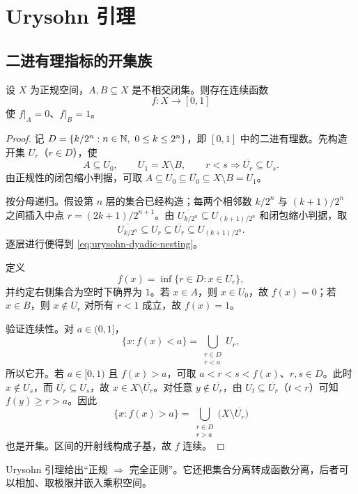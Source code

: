 \section{Urysohn 引理}

\subsection{二进有理指标的开集族}

\begin{theorem}[Urysohn 引理]
\label{thm:urysohn-lemma}
设 \(X\) 为正规空间，\(A,B\subseteq X\) 是不相交闭集。则存在连续函数
\[
 f:X\to[0,1]
\]
使 \(f|_A=0\)、\(f|_B=1\)。
\end{theorem}

\begin{proof}
记 \(D=\{k/2^n:n\in\mathbb{N},\ 0\le k\le2^n\}\)，即 \([0,1]\) 中的二进有理数。先构造开集 \(U_r\)（\(r\in D\)），使
\begin{equation}
 A\subseteq U_0,\qquad U_1=X\setminus B,\qquad
 r<s\Longrightarrow\overline{U_r}\subseteq U_s.
\label{eq:urysohn-dyadic-nesting}
\end{equation}
由正规性的闭包缩小判据，可取 \(A\subseteq U_0\subseteq\overline{U_0}\subseteq X\setminus B=U_1\)。

按分母递归。假设第 \(n\) 层的集合已经构造；每两个相邻数 \(k/2^n\) 与 \((k+1)/2^n\) 之间插入中点 \(r=(2k+1)/2^{n+1}\)。由
\(\overline{U_{k/2^n}}\subseteq U_{(k+1)/2^n}\) 和闭包缩小判据，取
\[
 \overline{U_{k/2^n}}\subseteq U_r
 \subseteq\overline{U_r}\subseteq U_{(k+1)/2^n}.
\]
逐层进行便得到 \eqref{eq:urysohn-dyadic-nesting}。

定义
\[
 f(x)=\inf\{r\in D:x\in U_r\},
\]
并约定右侧集合为空时下确界为 \(1\)。若 \(x\in A\)，则 \(x\in U_0\)，故 \(f(x)=0\)；若 \(x\in B\)，则 \(x\notin U_r\) 对所有 \(r<1\) 成立，故 \(f(x)=1\)。

验证连续性。对 \(a\in(0,1]\)，
\[
 \{x:f(x)<a\}=\bigcup_{\substack{r\in D\\r<a}}U_r,
\]
所以它开。若 \(a\in[0,1)\) 且 \(f(x)>a\)，可取 \(a<r<s<f(x)\)、\(r,s\in D\)。此时 \(x\notin U_s\)，而 \(\overline{U_r}\subseteq U_s\)，故 \(x\in X\setminus\overline{U_r}\)。对任意 \(y\notin\overline{U_r}\)，由 \(U_t\subseteq\overline{U_r}\)（\(t<r\)）可知 \(f(y)\ge r>a\)。因此
\[
 \{x:f(x)>a\}
 =\bigcup_{\substack{r\in D\\r>a}}\bigl(X\setminus\overline{U_r}\bigr)
\]
也是开集。区间的开射线构成子基，故 \(f\) 连续。
\end{proof}

Urysohn 引理给出“正规 \(\Rightarrow\) 完全正则”。它还把集合分离转成函数分离，后者可以相加、取极限并嵌入乘积空间。

